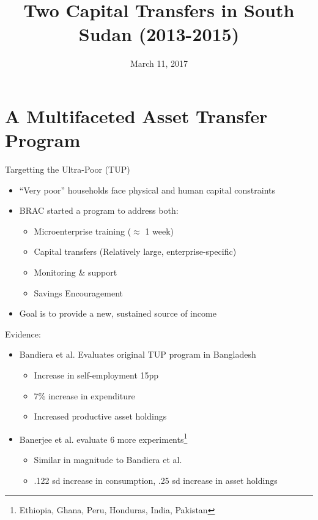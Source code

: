 \documentclass[t,presentation]{beamer}
\date{March 11, 2017}
\title{Two Capital Transfers in South Sudan (2013-2015)}
\begin{document}
\maketitle

\section*{A Multifaceted Asset Transfer Program}
\label{sec:orgheadline3}

\begin{frame}[label={sec:orgheadline1}]{Targetting the Ultra-Poor (TUP)}
\begin{itemize}
\item ``Very poor'' households face physical and human capital constraints
\item BRAC started a program to address both:

\begin{itemize}
\item Microenterprise training (\(\approx\) 1 week)
\item \alert{Capital transfers} (Relatively large, enterprise-specific)
\item Monitoring \& support
\item Savings Encouragement
\end{itemize}

\item Goal is to provide a new, sustained source of income
\end{itemize}
\end{frame}

\begin{frame}[label={sec:orgheadline2}]{Evidence:}
\begin{itemize}
\item \alert{Bandiera et al.} Evaluates original TUP program in Bangladesh
\begin{itemize}
\item Increase in self-employment 15pp
\item 7\% increase in expenditure
\item Increased productive asset holdings
\end{itemize}
\item \alert{Banerjee et al.} evaluate 6 more experiments\footnote{Ethiopia, Ghana, Peru, Honduras, India, Pakistan}
\begin{itemize}
\item Similar in magnitude to Bandiera et al.
\item .122 sd increase in consumption, .25 sd increase in asset holdings
\end{itemize}
\end{itemize}
\end{frame}
\end{document}
